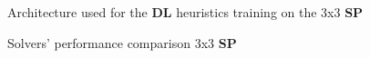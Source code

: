 \begin{figure}
  \noindent
  \caption[33SPnet]{Architecture used for the \textbf{DL} heuristics training on the 3x3 \textbf{SP}}
  \label{fig:33SPnets}
\end{figure}



\begin{figure}[H]
  \noindent
  \caption[33SPPerformance]{Solvers' performance comparison 3x3 \textbf{SP}}
  \label{fig:33SPPerformance}
\end{figure}


